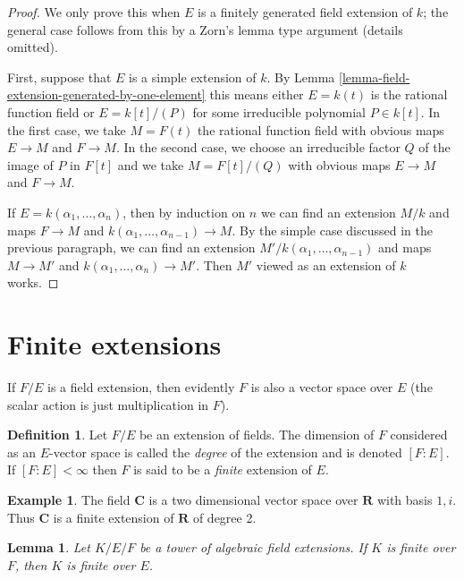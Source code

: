 \documentclass{stacks-project}
\theoremstyle{plain}
\newtheorem{lemma}[subsection]{Lemma}
\theoremstyle{definition}
\newtheorem{definition}[subsection]{Definition}
\newtheorem{example}[subsection]{Example}
\theoremstyle{remark}
\numberwithin{equation}{subsection}
\begin{document}
\begin{proof}
We only prove this when $E$ is a finitely generated field extension
of $k$; the general case follows from this by a Zorn's lemma type argument
(details omitted).

\medskip\noindent
First, suppose that $E$ is a simple extension of $k$. By
Lemma \ref{lemma-field-extension-generated-by-one-element}
this means either $E = k(t)$ is the rational function field
or $E = k[t]/(P)$ for some irreducible polynomial $P \in k[t]$.
In the first case, we take $M = F(t)$ the rational function field
with obvious maps $E \to M$ and $F \to M$. In the second case, we
choose an irreducible factor $Q$ of the image of $P$ in $F[t]$
and we take $M = F[t]/(Q)$ with obvious maps $E \to M$ and $F \to M$.

\medskip\noindent
If $E = k(\alpha_1, \ldots, \alpha_n)$, then by induction on $n$
we can find an extension $M/k$ and maps $F \to M$ and
$k(\alpha_1, \ldots, \alpha_{n - 1}) \to M$. By the simple
case discussed in the previous paragraph,
we can find an extension $M'/k(\alpha_1, \ldots, \alpha_{n - 1})$
and maps $M \to M'$ and $k(\alpha_1, \ldots, \alpha_n) \to M'$.
Then $M'$ viewed as an extension of $k$ works.
\end{proof}



\section{Finite extensions}
\label{section-finite-extensions}

\noindent
If $F/E$ is a field extension, then evidently $F$ is also a vector space
over $E$ (the scalar action is just multiplication in $F$).

\begin{definition}
\label{definition-degree}
Let $F/E$ be an extension of fields. The dimension of $F$ considered as an
$E$-vector space is called the {\it degree} of the extension and is
denoted $[F : E]$. If $[F : E] < \infty$ then $F$ is said to be a
{\it finite} extension of $E$.
\end{definition}

\begin{example}
\label{example-C-over-R}
The field $\mathbf{C}$ is a two dimensional vector space over $\mathbf{R}$
with basis $1, i$. Thus $\mathbf{C}$ is a finite extension of $\mathbf{R}$
of degree 2.
\end{example}

\begin{lemma}
\label{lemma-finite-goes-up}
Let $K/E/F$ be a tower of algebraic field extensions.
If $K$ is finite over $F$, then $K$ is finite over $E$.
\end{lemma}
\end{document}

